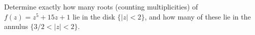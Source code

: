 Determine exactly how many roots (counting multiplicities) of
$f(z)=z^5+15z+1$ lie in the disk $\{|z|<2\}$, and how many of these
lie in the annulus $\{3/2<|z|<2\}$.
